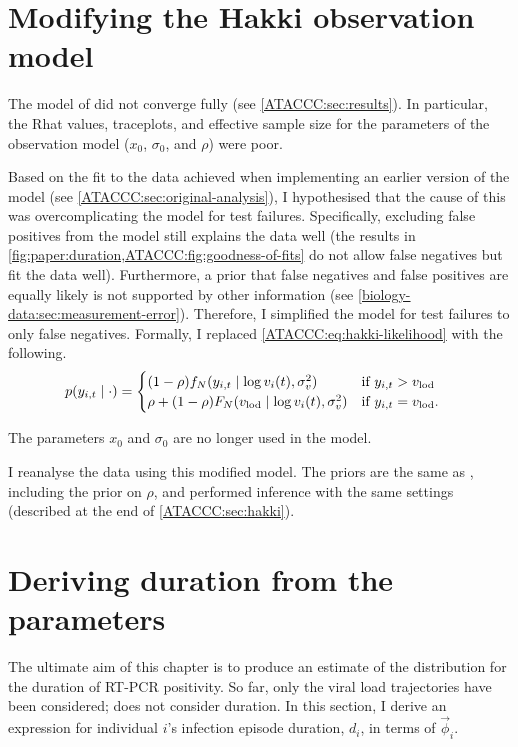 \documentclass[thesis.tex]{subfiles}
\begin{document}
\section{Modifying the Hakki observation model} \label{ATACCC:sec:observation-modification}

The model of \textcite{hakkiOnset} did not converge fully (see \cref{ATACCC:sec:results}).
In particular, the Rhat values, traceplots, and effective sample size for the parameters of the observation model ($x_0$, $\sigma_0$, and $\rho$) were poor.

Based on the fit to the data achieved when implementing an earlier version of the model (see \cref{ATACCC:sec:original-analysis}), I hypothesised that the cause of this was overcomplicating the model for test failures.
Specifically, excluding false positives from the model still explains the data well (the results in \cref{fig:paper:duration,ATACCC:fig:goodness-of-fits} do not allow false negatives but fit the data well).
Furthermore, a prior that false negatives and false positives are equally likely is not supported by other information (see \cref{biology-data:sec:measurement-error}).
Therefore, I simplified the model for test failures to only false negatives.
Formally, I replaced \cref{ATACCC:eq:hakki-likelihood} with the following.
\begin{align}
p(y_{i,t} \mid \cdot) &= \begin{cases}
    (1 - \rho) f_N(y_{i,t} \mid \log v_i(t), \sigma_v^2) & \text{if $y_{i,t} > v_\text{lod}$}\\
    \rho + (1 - \rho) F_N(v_\text{lod} \mid \log v_i(t), \sigma_v^2) & \text{if $y_{i,t} = v_\text{lod}$.}
\end{cases}
\end{align}

The parameters $x_0$ and $\sigma_0$ are no longer used in the model.

I reanalyse the data using this modified model.
The priors are the same as \textcite{hakkiOnset}, including the prior on $\rho$, and performed inference with the same settings (described at the end of \cref{ATACCC:sec:hakki}).


\section{Deriving duration from the parameters} \label{ATACCC:sec:duration}

The ultimate aim of this chapter is to produce an estimate of the distribution for the duration of RT-PCR positivity.
So far, only the viral load trajectories have been considered; \textcite{hakkiOnset} does not consider duration.
In this section, I derive an expression for individual $i$'s infection episode duration, $d_i$, in terms of $\vec{\phi}_i$.
\end{document}
